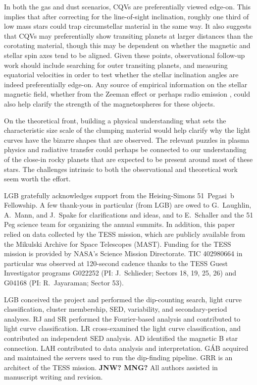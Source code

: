 \documentclass[11pt,twocolumn,tighten]{aastex63}
\begin{document}
In both the gas and dust scenarios, CQVs are preferentially viewed
edge-on.  This implies that after correcting for the line-of-sight
inclination, roughly one third of low mass stars \citep[those that
rotate rapidly enough][]{2022AJ....163..144G} could trap circumstellar
material in the same way.  It also suggests that CQVs may
preferentially show transiting planets at larger distances than the
corotating material, though this may be dependent on whether the
magnetic and stellar spin axes tend to be aligned.  Given these
points, observational follow-up work should include searching for
outer transiting planets, and measuring equatorial velocities in order
to test whether the stellar inclination angles are indeed
preferentially edge-on.  Any source of empirical information on the
stellar magnetic field, whether from the Zeeman effect
\citep[e.g.][]{2021A&ARv..29....1K} or perhaps radio emission
\citep[e.g.][]{2015Natur.523..568H}, could also help clarify the
strength of the magnetospheres for these objects.

On the theoretical front, building a physical understanding what sets
the characteristic size scale of the clumping material would help
clarify why the light curves have the bizarre shapes that are
observed.  The relevant puzzles in plasma physics and radiative
transfer could perhaps be connected to our understanding of the
close-in rocky planets that are expected to be present around most of
these stars.  The challenges intrinsic to both the observational and
theoretical work seem worth the effort.



\acknowledgments
LGB gratefully acknowledges support from the Heising-Simons
51~Pegasi~b Fellowship.  A few thank-yous in particular (from LGB) are
owed to G.~Laughlin, A.~Mann, and J.~Spake for clarifications and
ideas, and to E.~Schaller and the 51 Peg science team for organizing
the annual summits.  In addition, this paper relied on data collected
by the TESS mission, which are publicly available from the Mikulski
Archive for Space Telescopes (MAST).  Funding for the TESS mission is
provided by NASA’s Science Mission Directorate.  TIC 402980664 in
particular was observed at 120-second cadence thanks to the TESS Guest
Investigator programs G022252 (PI: J.~Schlieder; Sectors 18, 19, 25,
26) and G04168 (PI: R.~Jayaraman; Sector 53).

LGB conceived the project and performed the dip-counting search, light
curve classification, cluster membership, SED, variability, and
secondary-period analyses.
RJ and SR performed the Fourier-based analysis and contributed
to light curve classification.
LR cross-examined the light curve classification, and contributed an independent SED analysis.
AD identified the magnetic B star connection.
LAH contributed to data analysis and interpretation.
G\'AB acquired and maintained the servers used to run the dip-finding pipeline.
GRR is an architect of the TESS mission.
{\bf JNW?  MNG?}
All authors assisted in manuscript writing and revision.
\end{document}
